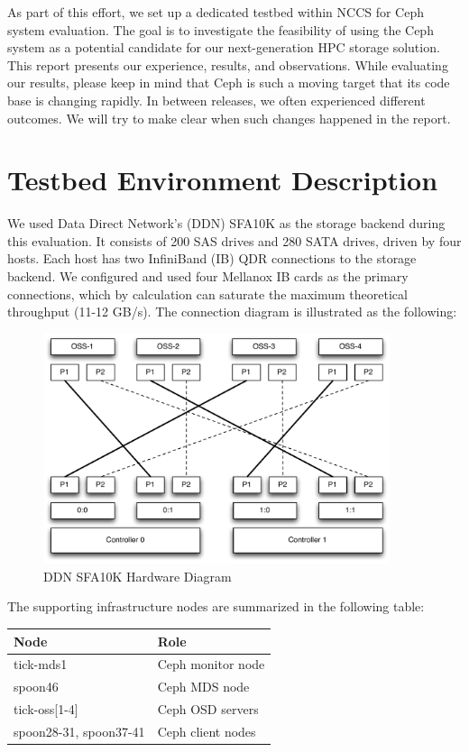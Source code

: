 \documentclass{article}
\begin{document}
As part of this effort, we set up a dedicated testbed within NCCS for Ceph
system evaluation. The goal is to investigate the feasibility of using the Ceph system as
a potential candidate for our next-generation HPC storage solution.
This report presents our experience, results, and observations. While evaluating
our results, please keep in mind that Ceph is such a moving target that its
code base is changing rapidly. In between releases, we often experienced different
outcomes. We will try to make clear when such changes happened in the report.

\section{Testbed Environment Description}

We used Data Direct Network's (DDN) SFA10K as the storage backend during this evaluation. It consists of
200 SAS drives and 280 SATA drives, driven by four hosts. Each host has two InfiniBand (IB) QDR
connections to the storage backend. We configured and used four Mellanox IB cards as the
primary connections, which by calculation can saturate the maximum theoretical
throughput (11-12 GB/s). The connection diagram is illustrated as the
following:

\begin{figure}[htb]
\centering
\includegraphics[width=4in]{figs/sfa10k}
\caption{DDN SFA10K Hardware Diagram}
\end{figure}


The supporting infrastructure nodes are summarized in the following table:

\begin{table}[H]
\centering
    \begin{tabular}{ll}
    \toprule
    Node & Role \\
    \midrule
    tick-mds1 & Ceph monitor node \\
    spoon46 & Ceph MDS node \\
    tick-oss[1-4] & Ceph OSD servers \\
    spoon28-31, spoon37-41 & Ceph client nodes \\
    \bottomrule

    \end{tabular}

\end{table}
\end{document}
